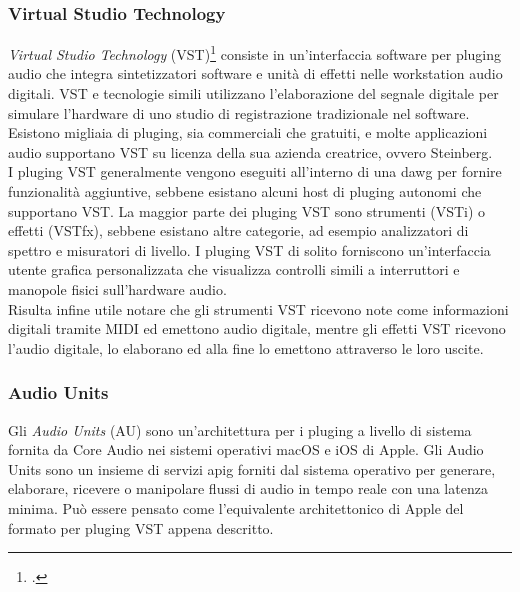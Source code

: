 \subsubsection*{Virtual Studio Technology}
\textit{Virtual Studio Technology} (VST)\footcite{site:vst} consiste in un'interfaccia software per \gls{pluging} audio che integra sintetizzatori software e unità di effetti nelle workstation audio digitali. VST e tecnologie simili utilizzano l'elaborazione del segnale digitale per simulare l'hardware di uno studio di registrazione tradizionale nel software. Esistono migliaia di \gls{pluging}, sia commerciali che gratuiti, e molte applicazioni audio supportano VST su licenza della sua azienda creatrice, ovvero Steinberg. \\
I \gls{pluging} VST generalmente vengono eseguiti all'interno di una \gls{dawg} per fornire funzionalità aggiuntive, sebbene esistano alcuni host di \gls{pluging} autonomi che supportano VST. La maggior parte dei \gls{pluging} VST sono strumenti (VSTi) o effetti (VSTfx), sebbene esistano altre categorie, ad esempio analizzatori di spettro e misuratori di livello. I \gls{pluging} VST di solito forniscono un'interfaccia utente grafica personalizzata che visualizza controlli simili a interruttori e manopole fisici sull'hardware audio.  \\
Risulta infine utile notare che gli strumenti VST ricevono note come informazioni digitali tramite MIDI ed emettono audio digitale, mentre gli effetti VST ricevono l'audio digitale, lo elaborano ed alla fine lo emettono attraverso le loro uscite.

\subsubsection*{Audio Units}
Gli \textit{Audio Units} (AU) sono un'architettura per i \gls{pluging} a livello di sistema fornita da Core Audio nei sistemi operativi macOS e iOS di Apple. Gli Audio Units sono un insieme di servizi \gls{apig} forniti dal sistema operativo per generare, elaborare, ricevere o manipolare flussi di audio in tempo reale con una latenza minima. Può essere pensato come l'equivalente architettonico di Apple del formato per \gls{pluging} VST appena descritto. 

